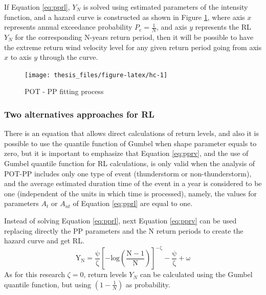 \documentclass[12pt,oneside]{reedthesis}
\begin{document}
If Equation \eqref{eq:pprl}, \(Y_N\) is solved using estimated parameters of the intensity function, and a hazard curve is constructed as shown in Figure \ref{fig:hc}, where axis \(x\) represents annual exceedance probability \(P_e = \frac{1}{N}\), and axis \(y\) represents the RL \(Y_N\) for the corresponding N-years return period, then it will be possible to have the extreme return wind velocity level for any given return period going from axis \(x\) to axis \(y\) through the curve.

\footnotesize
\begin{figure}

{\centering \texttt{[image: thesis\_files/figure-latex/hc-1]} 

}

\caption{POT - PP fitting process}\label{fig:hc}
\end{figure}
\normalsize

\hypertarget{two-alternatives-approaches-for-rl}{%
\subsubsection{Two alternatives approaches for RL}\label{two-alternatives-approaches-for-rl}}

There is an equation that allows direct calculations of return levels, and also it is possible to use the quantile function of Gumbel when shape parameter equals to zero, but it is important to emphasize that Equation \eqref{eq:pprv}, and the use of Gumbel quantile function for RL calculations, is only valid when the analysis of POT-PP includes only one type of event (thunderstorm or non-thunderstorm), and the average estimated duration time of the event in a year is considered to be one (independent of the units in which time is processed), namely, the values for parameters \(A_t\) or \(A_{nt}\) of Equation \eqref{eq:pprl} are equal to one.

Instead of solving Equation \eqref{eq:pprl}, next Equation \eqref{eq:pprv} can be used replacing directly the PP parameters and the N return periods to create the hazard curve and get RL.
\begin{equation}
  \mathrm{
Y_N=\frac{\psi}{\zeta}\left[-log\left(\frac{N-1}{N}\right)\right]^{-\zeta}-\frac{\psi}{\zeta}+\omega
        }
  \label{eq:pprv}
\end{equation}
As for this research \(\zeta = 0\), return levels \(Y_N\) can be calculated using the Gumbel quantile function, but using \((1-\frac{1}{N})\) as probability.
\end{document}
